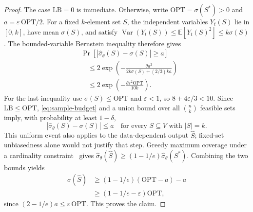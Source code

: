\documentclass[sigconf]{acmart}
\newcommand{\E}{\mathbb{E}}
\begin{document}
\begin{proof}
The case $\mathrm{LB}=0$ is immediate. Otherwise, write
$\mathrm{OPT}=\sigma(S^*)>0$ and $a=\varepsilon\,\mathrm{OPT}/2$.
For a fixed $k$-element set $S$, the independent variables $Y_t(S)$
lie in $[0,k]$, have mean $\sigma(S)$, and satisfy
$\operatorname{Var}(Y_t(S))\leq\E[Y_t(S)^2]\leq k\sigma(S)$.
The bounded-variable Bernstein inequality therefore gives
\begin{align*}
 &\Pr\!\left[|\hat\sigma_\theta(S)-\sigma(S)|\geq a\right]\\
 &\quad\leq2\exp\!\left(
       -\frac{\theta a^2}{2k\sigma(S)+(2/3)ka}\right)\\
 &\quad\leq2\exp\!\left(-\frac{\theta\varepsilon^2\mathrm{OPT}}{10k}\right).
\end{align*}
For the last inequality use $\sigma(S)\leq\mathrm{OPT}$ and
$\varepsilon<1$, so $8+4\varepsilon/3<10$. Since $\mathrm{LB}\leq\mathrm{OPT}$,
\eqref{eq:sample-budget} and a union bound over all $\binom nk$
feasible sets imply, with probability at least $1-\delta$,
\[
  |\hat\sigma_\theta(S)-\sigma(S)|\leq a
  \quad\text{for every }S\subseteq V\text{ with }|S|=k.
\]
This uniform event also applies to the data-dependent output $\hat S$;
fixed-set unbiasedness alone would not justify that step.
Greedy maximum coverage under a cardinality constraint~\cite{nemhauser1978analysis} gives
$\hat\sigma_\theta(\hat S)\geq(1-1/e)\hat\sigma_\theta(S^*)$.
Combining the two bounds yields
\begin{align*}
  \sigma(\hat S)
    &\geq(1-1/e)(\mathrm{OPT}-a)-a\\
    &\geq(1-1/e-\varepsilon)\mathrm{OPT},
\end{align*}
since $(2-1/e)a\leq\varepsilon\,\mathrm{OPT}$. This proves the claim.
\end{proof}
\end{document}
